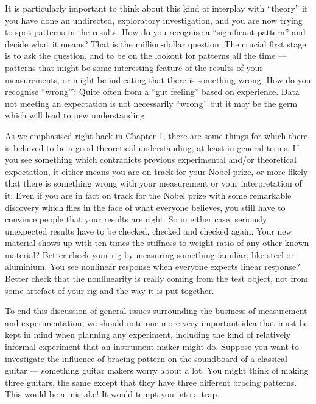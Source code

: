  It is particularly important to think about this kind of interplay with 
  “theory” if you have done an undirected, exploratory investigation, and you 
  are now trying to spot patterns in the results. How do you recognise a 
  “significant pattern” and decide what it means? That is the million-dollar 
  question. The crucial first stage is to ask the question, and to be on the 
  lookout for patterns all the time — patterns that might be some interesting 
  feature of the results of your measurements, or might be indicating that 
  there is something wrong. How do you recognise “wrong”? Quite often from a 
  “gut feeling” based on experience. Data not meeting an expectation is not 
  necessarily “wrong” but it may be the germ which will lead to new 
  understanding. 

  As we emphasised right back in Chapter 1, there are some things for which 
  there is believed to be a good theoretical understanding, at least in general 
  terms. If you see something which contradicts previous experimental and/or 
  theoretical expectation, it either means you are on track for your Nobel 
  prize, or more likely that there is something wrong with your measurement or 
  your interpretation of it. Even if you are in fact on track for the Nobel 
  prize with some remarkable discovery which flies in the face of what everyone 
  believes, you still have to convince people that your results are right. So 
  in either case, seriously unexpected results have to be checked, checked and 
  checked again. Your new material shows up with ten times the 
  stiffness-to-weight ratio of any other known material? Better check your rig 
  by measuring something familiar, like steel or aluminium. You see nonlinear 
  response when everyone expects linear response? Better check that the 
  nonlinearity is really coming from the test object, not from some artefact of 
  your rig and the way it is put together. 

  To end this discussion of general issues surrounding the business of 
  measurement and experimentation, we should note one more very important idea 
  that must be kept in mind when planning any experiment, including the kind of 
  relatively informal experiment that an instrument maker might do. Suppose you 
  want to investigate the influence of bracing pattern on the soundboard of a 
  classical guitar — something guitar makers worry about a lot. You might think 
  of making three guitars, the same except that they have three different 
  bracing patterns. This would be a mistake! It would tempt you into a trap. 


